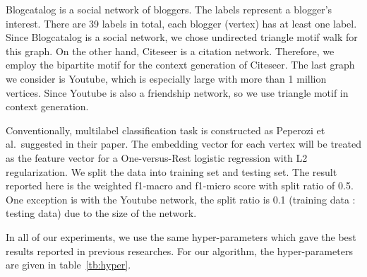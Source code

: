 \documentclass[letterpaper]{article}
\begin{document}
            Blogcatalog \cite{blogcatalog} is a social network of bloggers. The labels represent
            a blogger's interest. There are 39 labels in total, each blogger (vertex) has at least
            one label. Since Blogcatalog is a social network, we chose undirected triangle motif
            walk for this graph. On the other hand, Citeseer \cite{citeseer} 
            is a citation network. Therefore, we employ the bipartite motif for the context generation
            of Citeseer. The last graph we consider is Youtube, which is especially
            large with more than 1 million vertices. Since Youtube is also a friendship network,
            so we use triangle motif in context generation.

            Conventionally, multilabel classification task is constructed as Peperozi et al.\ suggested
            in their paper. The embedding vector for each vertex will be treated as the feature
            vector for a One-versus-Rest logistic regression with L2 regularization. We split the 
            data into training set and testing set. The result reported here is the weighted f1-macro and
            f1-micro score with split ratio of 0.5. One exception is with the Youtube network, the
            split ratio is 0.1 (training data : testing data) due to the size of the network.

            In all of our experiments, we use the same hyper-parameters which gave the best 
            results reported in previous researches. For our algorithm, the hyper-parameters
            are given in table~\ref{tb:hyper}.

            \begin{table}
                \centering
                \label{tb:hyper}
                \caption{MAGE Hyper-parameters}
            \end{table}
\end{document}
